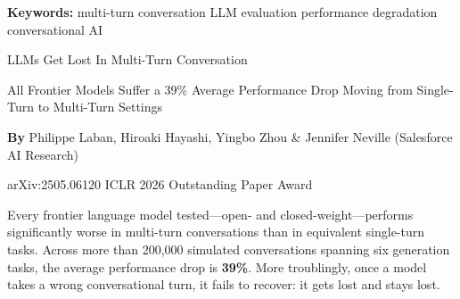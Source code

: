 \documentclass[10pt,twocolumn]{article}
\begin{document}
\setlength{\parindent}{0pt}
\setlength{\parskip}{4pt}

{\small\color{keywordgray}\textbf{Keywords:}
  multi-turn conversation \textbullet{}
  LLM evaluation \textbullet{}
  performance degradation \textbullet{}
  conversational AI}\par\vspace{4pt}

{\LARGE\bfseries\raggedright
  LLMs Get Lost In Multi-Turn Conversation}\par\vspace{4pt}

{\large\itshape\raggedright
  All Frontier Models Suffer a 39\% Average Performance Drop
  Moving from Single-Turn to Multi-Turn Settings}\par\vspace{6pt}

{\small\textbf{By} Philippe Laban, Hiroaki Hayashi, Yingbo Zhou \&
  Jennifer Neville (Salesforce AI Research)}\par\vspace{2pt}

{\small\color{keywordgray}arXiv:2505.06120 \textbullet{}
  ICLR 2026 Outstanding Paper Award}
\par\vspace{2pt}\noindent{\color{rulered}\rule{\columnwidth}{0.6pt}}\vspace{6pt}

Every frontier language model tested---open- and closed-weight---performs
significantly worse in multi-turn conversations than in equivalent single-turn
tasks. Across more than 200,000 simulated conversations spanning six generation
tasks, the average performance drop is \textbf{39\%}. More troublingly,
once a model takes a wrong conversational turn, it fails to recover:
it gets lost and stays lost.
\end{document}
